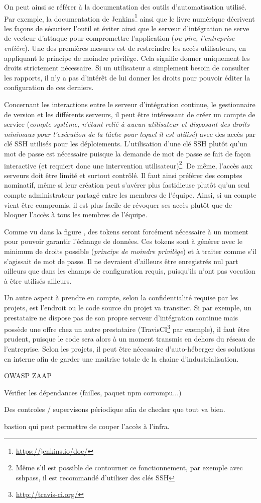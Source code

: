 On peut ainsi se référer à la documentation des outils d'automatisation utilisé. Par exemple, la documentation de Jenkins\footnote{\url{https://jenkins.io/doc/}} ainsi que le livre numérique  \cite[chapitre 7, Sécuriser Jenkins]{jenkins-guide} décrivent les façons de sécuriser l'outil et éviter ainsi que le serveur d'intégration ne serve de vecteur d'attaque pour compromettre l'application (\emph{ou pire, l'entreprise entière}). Une des premières mesures est de restreindre les accès utilisateurs, en appliquant le principe de moindre privilège. Cela signifie donner uniquement les droits strictement nécessaire. Si un utilisateur a simplement besoin de consulter les rapports, il n'y a pas d'intérêt de lui donner les droits pour pouvoir éditer la configuration de ces derniers.

Concernant les interactions entre le serveur d'intégration continue, le gestionnaire de version et les différents serveurs, il peut être intéressant de créer un compte de service (\emph{compte système, n'étant relié à aucun utilisateur et disposant des droits minimaux pour l'exécution de la tâche pour lequel il est utilisé}) avec des accès par clé \gls{SSH} utilisés pour les déploiements. L'utilisation d'une clé \gls{SSH} plutôt qu'un mot de passe est nécessaire puisque la demande de mot de passe se fait de façon interactive (et requiert donc une intervention utilisateur)\footnote{Même s'il est possible de contourner ce fonctionnement, par exemple avec sshpass, il est recommandé d'utiliser des clés \gls{SSH}}. De même, l'accès aux serveurs doit être limité et surtout contrôlé. Il faut ainsi préférer des comptes nominatif, même si leur création peut s'avérer plus fastidieuse plutôt qu'un seul compte administrateur partagé entre les membres de l'équipe. Ainsi, si un compte vient être compromis, il est plus facile de révoquer ses accès plutôt que de bloquer l'accès à tous les membres de l'équipe.

Comme vu dans la figure , des tokens seront forcément nécessaire à un moment pour pouvoir garantir l'échange de données. Ces tokens sont à générer avec le minimum de droits possible (\emph{principe de moindre privilège}) et à traiter comme s'il s'agissait de mot de passe. Il ne devraient d'ailleurs être enregistrés nul part ailleurs que dans les champs de configuration requis, puisqu'ils n'ont pas vocation à être utilisés ailleurs.

Un autre aspect à prendre en compte, selon la confidentialité requise par les projets, est l'endroit ou le code source du projet va transiter. Si par exemple, un prestataire ne dispose pas de son propre serveur d'intégration continue mais possède une offre chez un autre prestataire (TravisCI\footnote{\url{http://travis-ci.org/}} par exemple), il faut être prudent, puisque le code sera alors à un moment transmis en dehors du réseau de l'entreprise. Selon les projets, il peut être nécessaire d'auto-héberger des solutions en interne afin de garder une maitrise totale de la chaine d'industrialisation.


OWASP ZAAP

Vérifier les dépendances (failles, paquet npm corrompu...)

Des controles / supervisons périodique afin de checker que tout va bien.

bastion qui peut permettre de couper l'accès à l'infra.